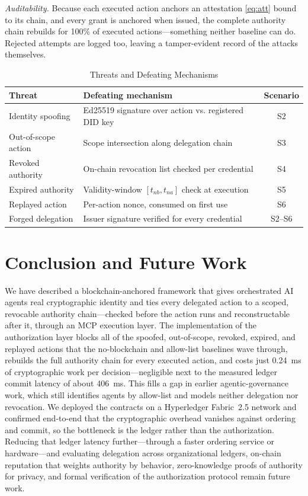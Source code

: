 \documentclass[conference]{IEEEtran}
\begin{document}
\textit{Auditability.} Because each executed action anchors an attestation \eqref{eq:att} bound to its chain, and every grant is anchored when issued, the complete authority chain rebuilds for 100\% of executed actions---something neither baseline can do. Rejected attempts are logged too, leaving a tamper-evident record of the attacks themselves.

\begin{table}[t]
\centering
\caption{Threats and Defeating Mechanisms}
\label{tab:threat}
\renewcommand{\arraystretch}{1.3}
\begin{tabular}{@{}p{1.6cm}p{4.0cm}c@{}}
\toprule
\textbf{Threat} & \textbf{Defeating mechanism} & \textbf{Scenario}\\
\midrule
Identity spoofing   & Ed25519 signature over action vs. registered DID key & S2\\
Out-of-scope action & Scope intersection along delegation chain            & S3\\
Revoked authority   & On-chain revocation list checked per credential      & S4\\
Expired authority   & Validity-window $[t_{nb}, t_{na}]$ check at execution & S5\\
Replayed action     & Per-action nonce, consumed on first use              & S6\\
Forged delegation   & Issuer signature verified for every credential       & S2--S6\\
\bottomrule
\end{tabular}
\end{table}

\section{Conclusion and Future Work}\label{sec:concl}
We have described a blockchain-anchored framework that gives orchestrated AI agents real cryptographic identity and ties every delegated action to a scoped, revocable authority chain---checked before the action runs and reconstructable after it, through an MCP execution layer. The implementation of the authorization layer blocks all of the spoofed, out-of-scope, revoked, expired, and replayed actions that the no-blockchain and allow-list baselines wave through, rebuilds the full authority chain for every executed action, and costs just 0.24~ms of cryptographic work per decision---negligible next to the measured ledger commit latency of about 406~ms. This fills a gap in earlier agentic-governance work, which still identifies agents by allow-list and models neither delegation nor revocation. We deployed the contracts on a Hyperledger Fabric~2.5 network and confirmed end-to-end that the cryptographic overhead vanishes against ordering and commit, so the bottleneck is the ledger rather than the authorization. Reducing that ledger latency further---through a faster ordering service or hardware---and evaluating delegation across organizational ledgers, on-chain reputation that weights authority by behavior, zero-knowledge proofs of authority for privacy, and formal verification of the authorization protocol remain future work.
\end{document}

